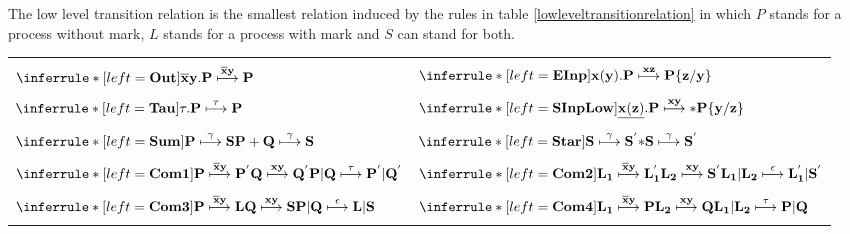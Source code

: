 \begin{definition}
  The low level transition relation is the smallest relation induced by the rules in table \ref{lowleveltransitionrelation} in which $P$ stands for a process without mark, $L$ stands for a process with mark and $S$ can stand for both. 
  \begin{table}
    \begin{tabular}{ll}
	  \hline\\
	  $\inferrule* [left=\bf{Out}]{
	  }{
	    \overline{x}y.P \stackrel{\overline{x}y}{\longmapsto} P
	  }$
	&
	  $\inferrule* [left=\bf{EInp}]{
	  }{
	    x(y).P \stackrel{xz}{\longmapsto} P\{z/y\}
	  }$
      \\\\
	  $\inferrule* [left=\bf{Tau}]{
	  }{
	    \tau.P \stackrel{\tau}{\longmapsto} P
	  }$
	&
	  $\inferrule* [left=\bf{SInpLow}]{
	  }{
	    \underline{x(z)}.P \stackrel{xy}{\longmapsto} * P\{y/z\}
	  }$
      \\\\
	  $\inferrule* [left=\bf{Sum}]{
	    P \stackrel{\gamma}{\longmapsto} S
	  }{
	    P+Q \stackrel{\gamma}{\longmapsto} S
	  }$
	&
	  $\inferrule* [left=\bf{Star}]{
	      S \stackrel{\gamma}{\longmapsto} S^{'}
	  }{
	      *S \stackrel{\gamma}{\longmapsto} S^{'}
	  }$
      \\\\
	  $\inferrule* [left=\bf{Com1}]{
	      P \stackrel{\overline{x}y}{\longmapsto} P^{'}
	    \\
	      Q \stackrel{xy}{\longmapsto} Q^{'}
	  }{
	    P|Q \stackrel{\tau}{\longmapsto} P^{'}|Q^{'}
	  }$
	&
	  $\inferrule* [left=\bf{Com2}]{
	      L_{1} \stackrel{\overline{x}y}{\longmapsto} L_{1}^{'}
	    \\
	      L_{2} \stackrel{xy}{\longmapsto} S^{'}
	  }{
	    L_{1}|L_{2} \stackrel{\epsilon}{\longmapsto} L_{1}^{'}|S^{'}
	  }$
      \\\\
	  $\inferrule* [left=\bf{Com3}]{
	      P \stackrel{\overline{x}y}{\longmapsto} L
	    \\
	      Q \stackrel{xy}{\longmapsto} S
	  }{
	    P|Q \stackrel{\epsilon}{\longmapsto} L|S
	  }$
	&
	  $\inferrule* [left=\bf{Com4}]{
	      L_{1} \stackrel{\overline{x}y}{\longmapsto} P
	    \\
	      L_{2} \stackrel{xy}{\longmapsto} Q
	  }{
	    L_{1}|L_{2} \stackrel{\tau}{\longmapsto} P|Q
	  }$
      \\\\

\end{tabular}
\end{table}
\end{definition}
